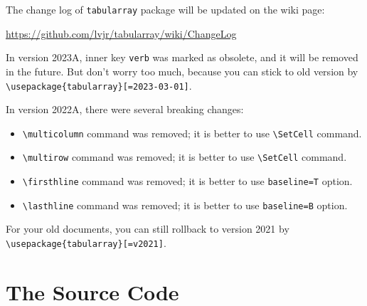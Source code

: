 \documentclass[oneside]{book}
\begin{document}
The change log of \verb!tabularray! package will be updated on the wiki page:\newline
\centerline{\url{https://github.com/lvjr/tabularray/wiki/ChangeLog}}

In version 2023A, inner key \verb!verb! was marked as obsolete,
and it will be removed in the future. But don't worry too much,
because you can stick to old version by \verb!\usepackage{tabularray}[=2023-03-01]!.

In version 2022A, there were several breaking changes:

\begin{itemize}[nosep]
  \item \verb!\multicolumn! command was removed; it is better to use \verb!\SetCell! command.
  \item \verb!\multirow! command was removed; it is better to use \verb!\SetCell! command.
  \item \verb!\firsthline! command was removed; it is better to use \verb!baseline=T! option.
  \item \verb!\lasthline! command was removed; it is better to use \verb!baseline=B! option.
\end{itemize}

For your old documents, you can still rollback to version 2021 by \verb!\usepackage{tabularray}[=v2021]!.

\chapter{The Source Code}

\end{document}
